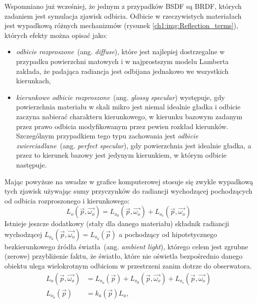 Wspomniano już wcześniej, że jednym z przypadków BSDF są BRDF, których zadaniem jest symulacja zjawisk odbicia. Odbicie w rzeczywistych materiałach jest wypadkową różnych mechanizmów (rysunek \ref{ch1:img:Reflection_terms}), których efekty można opisać jako:
\begin{itemize}
\item \textit{odbicie rozproszone}~(ang. \textit{diffuse}), które jest najlepiej dostrzegalne w przypadku powierzchni matowych i w najprostszym modelu Lamberta zakłada, że padająca radiancja jest odbijana jednakowo we wszystkich kierunkach,
\item \textit{kierunkowe odbicie rozproszone}~(ang. \textit{glossy specular}) występuje, gdy powierzchnia materiału w skali mikro jest niemal idealnie gładka i odbicie zaczyna nabierać charakteru kierunkowego, w kierunku bazowym zadanym przez prawo odbicia modyfikowanym przez pewien rozkład kierunków. Szczególnym przypadkiem tego typu zachowania jest \textit{odbicie zwierciadlane}~(ang. \textit{perfect specular}), gdy powierzchnia jest idealnie gładka, a przez to kierunek bazowy jest jedynym kierunkiem, w którym odbicie następuje. 
\end{itemize}
Mając powyższe na uwadze w grafice komputerowej stosuje się zwykle wypadkową tych zjawisk używając sumy przyczynków do radiancji wychodzącej pochodzących od odbicia rozproszonego i kierunkowego:
\begin{equation}
L_o(\vec{p}, \vec{\omega_o}) = L_{o_d}(\vec{p}, \vec{\omega_o}) + L_{o_s}(\vec{p}, \vec{\omega_o})
\end{equation}
Istnieje jeszcze dodatkowy (stały dla danego materiału) składnik radiancji wychodzącej $L_{o_a}(\vec{p}, \vec{\omega_o})=L_{o_a}(\vec{p})$ a pochodzący od hipotetycznego bezkierunkowego źródła światła~(ang. \textit{ambient light}), którego celem jest zgrubne (zerowe) przybliżenie faktu, że światło, które nie oświetla bezpośrednio danego obiektu ulega wielokrotnym odbiciom w przestrzeni zanim dotrze do obserwatora. 
\begin{align}
L_o(\vec{p}, \vec{\omega_o}) &= L_{o_a}(\vec{p}) + L_{o_d}(\vec{p}, \vec{\omega_o}) + L_{o_s}(\vec{p}, \vec{\omega_o})\\
L_{o_a}(\vec{p}) &= k_a(\vec{p})L_a,
\end{align}
